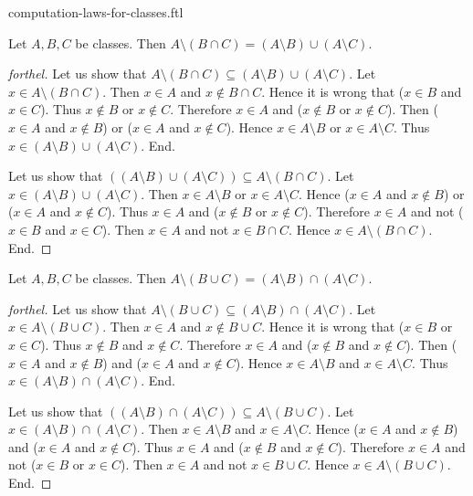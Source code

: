 \documentclass{naproche-library}
\begin{document}
\begin{smodule}{computation-laws-for-classes.ftl}
  \begin{proposition}[forthel,id=FOUNDATIONS_02_5296031436636160,printid]
    Let $A, B, C$ be classes.
    Then $A \setminus (B \cap C) = (A \setminus B) \cup (A \setminus C)$.
  \end{proposition}
  \begin{proof}[forthel]
    Let us show that $A \setminus (B \cap C) \subseteq (A \setminus B) \cup (A \setminus C)$.
      Let $x \in A \setminus (B \cap C)$.
      Then $x \in A$ and $x \notin B \cap C$.
      Hence it is wrong that ($x \in B$ and $x \in C$).
      Thus $x \notin B$ or $x \notin C$.
      Therefore $x \in A$ and ($x \notin B$ or $x \notin C$).
      Then ($x \in A$ and $x \notin B$) or ($x \in A$ and $x \notin C$).
      Hence $x \in A \setminus B$ or $x \in A \setminus C$.
      Thus $x \in (A \setminus B) \cup (A \setminus C)$.
    End.

    Let us show that $((A \setminus B) \cup (A \setminus C)) \subseteq A \setminus (B \cap C)$. %
      Let $x \in (A \setminus B) \cup (A \setminus C)$.
      Then $x \in A \setminus B$ or $x \in A \setminus C$.
      Hence ($x \in A$ and $x \notin B$) or ($x \in A$ and $x \notin C$).
      Thus $x \in A$ and ($x \notin B$ or $x \notin C$).
      Therefore $x \in A$ and not ($x \in B$ and $x \in C$).
      Then $x \in A$ and not $x \in B \cap C$.
      Hence $x \in A \setminus (B \cap C)$.
    End.
  \end{proof}

  \begin{proposition}[forthel,id=FOUNDATIONS_02_2909554153095168,printid]
    Let $A, B, C$ be classes.
    Then $A \setminus (B \cup C) = (A \setminus B) \cap (A \setminus C)$.
  \end{proposition}
  \begin{proof}[forthel]
    Let us show that $A \setminus (B \cup C) \subseteq (A \setminus B) \cap (A \setminus C)$.
      Let $x \in A \setminus (B \cup C)$.
      Then $x \in A$ and $x \notin B \cup C$.
      Hence it is wrong that ($x \in B$ or $x \in C$).
      Thus $x \notin B$ and $x \notin C$.
      Therefore $x \in A$ and ($x \notin B$ and $x \notin C$).
      Then ($x \in A$ and $x \notin B$) and ($x \in A$ and $x \notin C$).
      Hence $x \in A \setminus B$ and $x \in A \setminus C$.
      Thus $x \in (A \setminus B) \cap (A \setminus C)$.
    End.

    Let us show that $((A \setminus B) \cap (A \setminus C)) \subseteq A \setminus (B \cup C)$. %
      Let $x \in (A \setminus B) \cap (A \setminus C)$.
      Then $x \in A \setminus B$ and $x \in A \setminus C$.
      Hence ($x \in A$ and $x \notin B$) and ($x \in A$ and $x \notin C$).
      Thus $x \in A$ and ($x \notin B$ and $x \notin C$).
      Therefore $x \in A$ and not ($x \in B$ or $x \in C$).
      Then $x \in A$ and not $x \in B \cup C$.
      Hence $x \in A \setminus (B \cup C)$.
    End.
  \end{proof}



\end{smodule}
\end{document}
